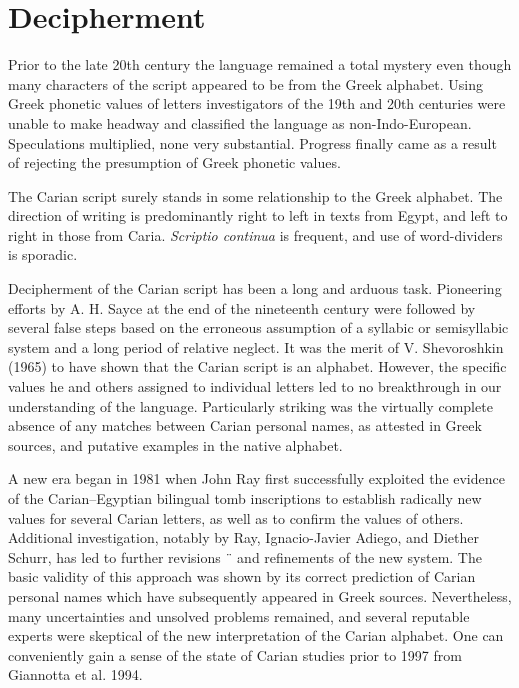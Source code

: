 \section{Decipherment}

Prior to the late 20th century the language remained a total mystery even though many characters of the script appeared to be from the Greek alphabet. Using Greek phonetic values of letters investigators of the 19th and 20th centuries were unable to make headway and classified the language as non-Indo-European. Speculations multiplied, none very substantial. Progress finally came as a result of rejecting the presumption of Greek phonetic values.

The Carian script surely stands in some relationship to the Greek alphabet. The direction
of writing is predominantly right to left in texts from Egypt, and left to right in those from
Caria. \emph{Scriptio continua} is frequent, and use of word-dividers is sporadic.

Decipherment of the Carian script has been a long and arduous task. Pioneering efforts
by A. H. Sayce at the end of the nineteenth century were followed by several false steps
based on the erroneous assumption of a syllabic or semisyllabic system and a long period of
relative neglect. It was the merit of V. Shevoroshkin (1965) to have shown that the Carian
script is an alphabet. However, the specific values he and others assigned to individual letters
led to no breakthrough in our understanding of the language. Particularly striking was the
virtually complete absence of any matches between Carian personal names, as attested in
Greek sources, and putative examples in the native alphabet.

A new era began in 1981 when John Ray first successfully exploited the evidence of
the Carian–Egyptian bilingual tomb inscriptions to establish radically new values for several
Carian letters, as well as to confirm the values of others. Additional investigation,
notably by Ray, Ignacio-Javier Adiego, and Diether Schurr, has led to further revisions ¨
and refinements of the new system. The basic validity of this approach was shown by its
correct prediction of Carian personal names which have subsequently appeared in Greek
sources. Nevertheless, many uncertainties and unsolved problems remained, and several
reputable experts were skeptical of the new interpretation of the Carian alphabet. One can
conveniently gain a sense of the state of Carian studies prior to 1997 from Giannotta et al.
1994.

